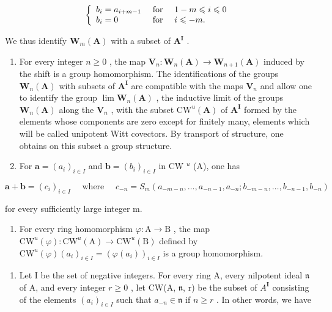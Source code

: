 \[
\left\{ \begin{array}{l l} b _ {i} = a _ {i + m - 1} & \text { for } \quad 1 - m \leqslant i \leqslant 0 \\ b _ {i} = 0 & \text { for } \quad i \leqslant - m. \end{array} \right.
\]

We thus identify \(\mathbf{W}_{m}(\mathbf{A})\) with a subset of \(\mathbf{A}^{\mathbf{I}}\) .

\begin{enumerate}
\def\labelenumi{\alph{enumi})}
\item
  For every integer \(n \geqslant 0\) , the map \(\mathbf{V}_n: \mathbf{W}_n(\mathbf{A}) \to \mathbf{W}_{n+1}(\mathbf{A})\) induced by the shift is a group homomorphism. The identifications of the groups \(\mathbf{W}_n(\mathbf{A})\) with subsets of \(\mathbf{A}^{\mathbf{I}}\) are compatible with the maps \(\mathbf{V}_n\) and allow one to identify the group \(\lim \mathbf{W}_n(\mathbf{A})\) , the inductive limit of the groups \(\mathbf{W}_n(\mathbf{A})\) along the \(\mathbf{V}_n\) , with the subset \(\mathrm{CW}^u(\mathbf{A})\) of \(\mathbf{A}^{\mathbf{I}}\) formed by the elements whose components are zero except for finitely many, elements which will be called unipotent Witt covectors. By transport of structure, one obtains on this subset a group structure.
\item
  For \(\boldsymbol{a} = (a_i)_{i\in I}\) and \(\boldsymbol{b} = (b_i)_{i\in I}\) in CW \(^u\) (A), one has
\end{enumerate}

\[
\boldsymbol {a} + \boldsymbol {b} = (c _ {i}) _ {i \in I} \quad \text { where } \quad c _ {- n} = S _ {m} (a _ {- m - n}, \dots , a _ {- n - 1}, a _ {- n}; b _ {- m - n}, \dots , b _ {- n - 1}, b _ {- n})
\]

for every sufficiently large integer m.

\begin{enumerate}
\def\labelenumi{\alph{enumi})}
\setcounter{enumi}{2}
\tightlist
\item
  For every ring homomorphism \(\varphi : \mathrm{A} \to \mathrm{B}\) , the map \(\mathrm{CW}^u(\varphi) : \mathrm{CW}^u(\mathrm{A}) \to \mathrm{CW}^u(\mathrm{B})\) defined by \(\mathrm{CW}^u(\varphi)(a_i)_{i\in I} = (\varphi(a_i))_{i\in I}\) is a group homomorphism.
\end{enumerate}

\begin{enumerate}
\def\labelenumi{\arabic{enumi})}
\setcounter{enumi}{23}
\tightlist
\item
  Let I be the set of negative integers. For every ring A, every nilpotent ideal \(\mathfrak{n}\) of A, and every integer \(r \geqslant 0\) , let CW(A, \(\mathfrak{n}\), r) be the subset of \(A^{\mathbf{I}}\) consisting of the elements \((a_{i})_{i \in I}\) such that \(a_{-n} \in \mathfrak{n}\) if \(n \geqslant r\) . In other words, we have
\end{enumerate}

